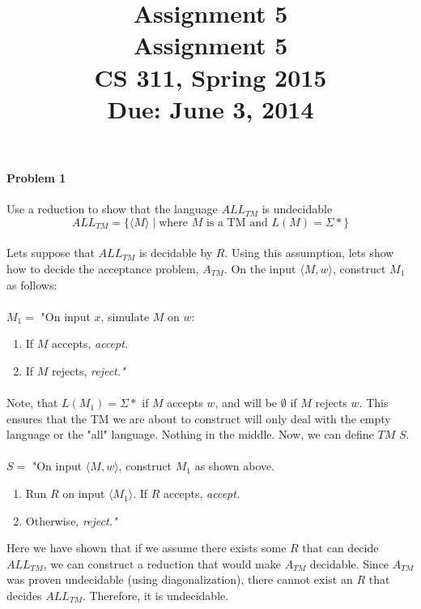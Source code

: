 \documentclass{article}
\title{\vspace{-3ex} \bf Assignment 5 \\[1ex]}
\title{\vspace{-3ex} \bf Assignment 5 \\[1ex]\rm\normalsize CS 311, Spring 2015 \\ Due: June 3, 2014}
\date{}
\author{}
\begin{document}
\maketitle
\paragraph{Problem 1} Use a reduction to show that the language $ALL_{TM}$ is undecidable
\[ALL_{TM} = \{ \langle M \rangle \;|\; \mbox{where $M$ is a TM and $L(M) = \Sigma*$} \}\]

\paragraph{} Lets suppose that $ALL_{TM}$ is decidable by $R$. Using this assumption, lets show how to decide the acceptance problem, $A_{TM}$.  On the input $\langle M,w\rangle$, construct $M_1$ as follows:
\\\\
\noindent $M_1 = $ "On input $x$, simulate $M$ on $w$: 
    \begin{enumerate}[\indent 1.]
    \item If $M$ accepts, \em accept.\em
    \item If $M$ rejects, \em reject."
    \end{enumerate}
\paragraph{} Note, that $L(M_1) = \Sigma*$ if $M$ accepts $w$, and will be $\emptyset$ if $M$ rejects $w$. This ensures that the TM we are about to construct will only deal with the empty language or the "all" language. Nothing in the middle. Now, we can define $TM$ $S$.
\\\\
\noindent $S = $ "On input $\langle M,w\rangle$, construct $M_1$ as shown above.
	\begin{enumerate}[\indent 1.]
	\item Run $R$ on input $\langle M_1\rangle$. If $R$ accepts, \em accept.\em
	\item Otherwise, \em reject."\em\\
	\end{enumerate}
\noindent Here we have shown that if we assume there exists some $R$ that can decide $ALL_{TM}$, we can construct a reduction that would make $A_{TM}$ decidable. Since $A_{TM}$ was proven undecidable (using diagonalization), there cannot exist an $R$ that decides $ALL_{TM}$. Therefore, it is undecidable.
\end{document}
